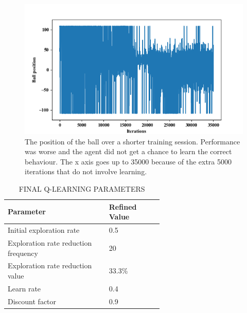 \documentclass[12pt,a4paper]{article}
\begin{document}
\begin{figure}[H]
	\includegraphics{154_small}
	\caption{The position of the ball over a shorter training session. Performance was worse and the agent did not get a chance to learn the correct behaviour. The x axis goes up to 35000 because of the extra 5000 iterations that do not involve learning.}
	\label{f4}
\end{figure}
\begin{table}[htb]
\centering
\caption{FINAL Q-LEARNING PARAMETERS}
\vspace*{6pt}
\label{q_params}
\begin{tabular}{>{\raggedright}p{0.4\linewidth}p{0.2\linewidth}}\hline
Parameter & Refined Value\\ \hline\hline
Initial exploration rate & 0.5\\ \hline
Exploration rate reduction frequency & 20\\ \hline
Exploration rate reduction value & 33.3\% \\\hline
Learn rate & 0.4 \\\hline
Discount factor & 0.9 \\\hline
\end{tabular}
\end{table}
\end{document}
